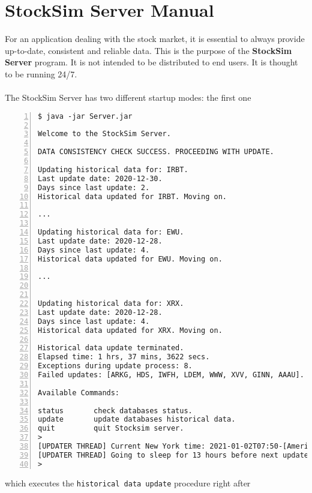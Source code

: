 \chapter{StockSim Server Manual}
For an application dealing with the stock market, it is essential to 
always provide up-to-date, consistent and reliable data. This is the purpose of 
the \textbf{StockSim Server} program. It is not intended to be distributed to 
end users. It is thought to be running 24/7.\\
\\
The StockSim Server has two different startup modes: the first one
\begin{lstlisting}[basicstyle=\footnotesize\ttfamily,language={},numbers=left,
numberstyle=\footnotesize,numbersep=8pt,frame=single]
$ java -jar Server.jar

Welcome to the StockSim Server.

DATA CONSISTENCY CHECK SUCCESS. PROCEEDING WITH UPDATE.

Updating historical data for: IRBT.
Last update date: 2020-12-30.
Days since last update: 2.
Historical data updated for IRBT. Moving on.

...

Updating historical data for: EWU.
Last update date: 2020-12-28.
Days since last update: 4.
Historical data updated for EWU. Moving on.

...


Updating historical data for: XRX.
Last update date: 2020-12-28.
Days since last update: 4.
Historical data updated for XRX. Moving on.

Historical data update terminated.
Elapsed time: 1 hrs, 37 mins, 3622 secs.
Exceptions during update process: 8.
Failed updates: [ARKG, HDS, IWFH, LDEM, WWW, XVV, GINN, AAAU].

Available Commands:

status       check databases status.
update       update databases historical data.
quit         quit Stocksim server.
> 
[UPDATER THREAD] Current New York time: 2021-01-02T07:50-[America/New_York]
[UPDATER THREAD] Going to sleep for 13 hours before next update.
> 
\end{lstlisting}
which executes the \texttt{historical data update} procedure right after

